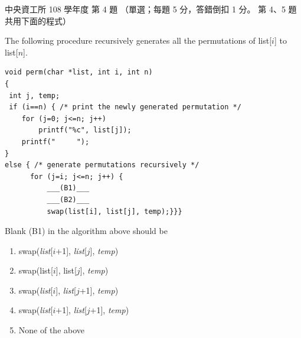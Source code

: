 \begin{pastexam}[label={px:ncu-108-dsa-04}]{中央資工所 108 學年度 第 4 題}
（單選；每題 5 分，答錯倒扣 1 分。 第 4、5 題共用下面的程式）

The following procedure recursively generates all the permutations of list[$i$] to list[$n$].
\begin{verbatim}
void perm(char *list, int i, int n)
{
 int j, temp;
 if (i==n) { /* print the newly generated permutation */
    for (j=0; j<=n; j++)
        printf("%c", list[j]);
    printf("     ");
}
else { /* generate permutations recursively */
      for (j=i; j<=n; j++) {
          ___(B1)___
          ___(B2)___
          swap(list[i], list[j], temp);}}}
\end{verbatim}

Blank (B1) in the algorithm above should be
\begin{enumerate}[label=(\Alph*)]
\item swap(\textit{list}[$i$+1], \textit{list}[$j$], \textit{temp})
\item swap(list[$i$], list[$j$], \textit{temp})
\item swap(\textit{list}[$i$], \textit{list}[$j$+1], \textit{temp})
\item swap(\textit{list}[$i$+1], \textit{list}[$j$+1], \textit{temp})
\item None of the above
\end{enumerate}
\end{pastexam}

